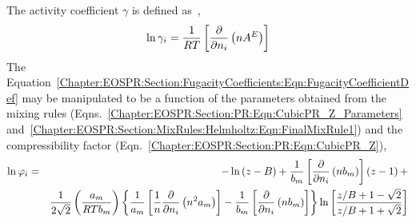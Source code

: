 The activity coefficient $\gamma$ is defined as~\citep{Sandler_Book},
    \begin{equation}
       \ln{\gamma_{i}} = \displaystyle\frac{1}{RT}\left[\displaystyle\frac{\partial}{\partial n_{i}}\left(nA^{E}\right)\right]
    \end{equation}
The Equation~\ref{Chapter:EOSPR:Section:FugacityCoefficients:Eqn:FugacityCoefficientDef} may be manipulated to be a function of the parameters obtained from the mixing rules (Eqns.~\ref{Chapter:EOSPR:Section:PR:Eqn:CubicPR_Z_Parameters} and~\ref{Chapter:EOSPR:Section:MixRules:Helmholtz:Eqn:FinalMixRule1}) and the compressibility factor (Eqn.~\ref{Chapter:EOSPR:Section:PR:Eqn:CubicPR_Z}),
    \begin{eqnarray}
      \ln{\varphi_{i}} &=& -\ln{\left(z-B\right)} + \displaystyle\frac{1}{b_{m}}\left[\displaystyle\frac{\partial}{\partial n_{i}}\left(nb_{m}\right)\right]\left(z-1\right) + \nonumber\\
                      & & \displaystyle\frac{1}{2\sqrt{2}}\left(\displaystyle\frac{a_{m}}{RTb_{m}}\right)\left\{\displaystyle\frac{1}{a_{m}}\left[\displaystyle\frac{1}{n}\displaystyle\frac{\partial}{\partial n_{i}}\left(n^{2}a_{m}\right)\right] - \displaystyle\frac{1}{b_{m}}\left[\displaystyle\frac{\partial}{\partial n_{i}}\left(nb_{m}\right)\right]\right\}\ln{\left[\displaystyle\frac{z/B+1-\sqrt{2}}{z/B+1+\sqrt{2}}\right]}\label{Chapter:EOSPR:Section:FugacityCoefficients:Eqn:FugacityCoefficient_Final}
    \end{eqnarray}
